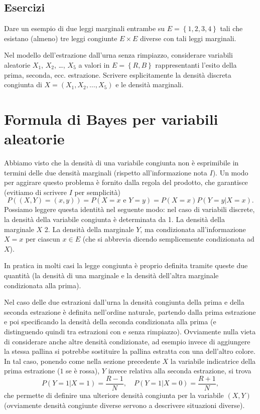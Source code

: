 \documentclass[
  italian,
  letterpaper,
]{book}
\newcommand{\cur}[1]{\left\{ #1 \right\}}
\theoremstyle{definition}
\theoremstyle{remark}
\begin{document}
\subsection{Esercizi}\label{esercizi-12}

Dare un esempio di due leggi marginali entrambe su \(E= \cur{1,2,3,4}\)
tali che esistano (almeno) tre leggi congiunte \(E\times E\) diverse con
tali leggi marginali.

Nel modello dell'estrazione dall'urna senza rimpiazzo, considerare
variabili aleatorie \(X_1\), \(X_2\), \ldots, \(X_5\) a valori in
\(E = \cur{R, B}\) rappresentanti l'esito della prima, seconda, ecc.
estrazione. Scrivere esplicitamente la densità discreta congiunta di
\(X=(X_1, X_2, \ldots, X_5)\) e le densità marginali.

\section{Formula di Bayes per variabili aleatorie}\label{sec-bayes-va}

Abbiamo visto che la densità di una variabile congiunta non è
esprimibile in termini delle due densità marginali (rispetto
all'informazione nota \(I\)). Un modo per aggirare questo problema è
fornito dalla regola del prodotto, che garantisce (evitiamo di scrivere
\(I\) per semplicità)
\[ P( (X,Y) = (x,y)) = P(X=x \text{ e } Y = y ) = P(X=x) P(Y=y |  X=x).\]
Possiamo leggere questa identità nel seguente modo: nel caso di
variabili discrete, la densità della variabile congiunta è determinata
da 1. La densità della marginale \(X\) 2. La densità della marginale
\(Y\), ma condizionata all'informazione \(X=x\) per ciascun \(x \in E\)
(che si abbrevia dicendo semplicemente condizionata ad \(X\)).

In pratica in molti casi la legge congiunta è proprio definita tramite
queste due quantità (la densità di una marginale e la densità dell'altra
marginale condizionata alla prima).

Nel caso delle due estrazioni dall'urna la densità congiunta della prima
e della seconda estrazione è definita nell'ordine naturale, partendo
dalla prima estrazione e poi specificando la densità della seconda
condizionata alla prima (e distinguendo quindi tra estrazioni con e
senza rimpiazzo). Ovviamente nulla vieta di considerare anche altre
densità condizionate, ad esempio invece di aggiungere la stessa pallina
si potrebbe sostituire la pallina estratta con una dell'altro colore. In
tal caso, ponendo come nella sezione precedente \(X\) la variabile
indicatrice della prima estrazione (\(1\) se è rossa), \(Y\) invece
relativa alla seconda estrazione, si trova
\[ P(Y =1 | X=1) = \frac{R-1}{N}, \quad  P(Y =1 | X=0) = \frac{R+1}{N},\]
che permette di definire una ulteriore densità congiunta per la
variabile \((X,Y)\) (ovviamente densità congiunte diverse servono a
descrivere situazioni diverse).
\end{document}
